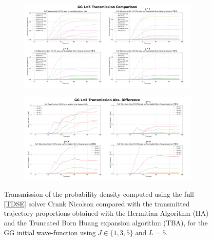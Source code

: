 \documentclass[11pt, a4paper]{article} %
\begin{document}
\begin{figure}[p]
  \centering
  \begin{subfigure}[b]{1.1\linewidth}
    \includegraphics[width=\linewidth]{Example_Results/GG_L_5_transmission.png}
  \end{subfigure}
  \begin{subfigure}[b]{1.1\linewidth}
    \includegraphics[width=\linewidth]{Example_Results/GG_L_5_errors.png}
  \end{subfigure}

  
  \caption{ Transmission of the probability density computed using the full \ref{TDSE} solver Crank Nicolson compared with the transmitted trajectory proportions obtained with the Hermitian Algorithm (HA) and the Truncated Born Huang expansion algorithm (TBA), for the GG initial wave-function using $J\in\{1,3,5\}$ and $L=5$. }
  \label{fig:transm_GG_L5}
\end{figure}
\end{document}
